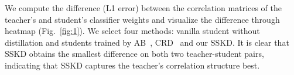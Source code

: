 \documentclass[runningheads]{llncs}
\begin{document}
We compute the difference (L1 error) between the correlation matrices of the teacher’s and student’s classifier weights and visualize the difference through heatmap (Fig.~\ref{fig:1}). We select four methods: vanilla student without distillation and students trained by AB~\cite{AB}, CRD~\cite{crd} and our SSKD. It is clear that SSKD obtains the smallest difference on both two teacher-student pairs, indicating that SSKD captures the teacher's correlation structure best. 
\end{document}
